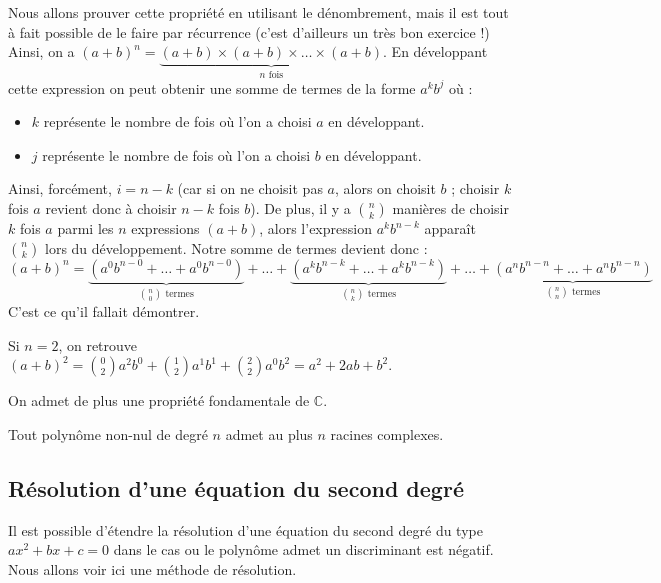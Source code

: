 	\begin{demonstration}
		\contentwidth[big]
		Nous allons prouver cette propriété en utilisant le dénombrement, mais il est tout à fait possible de le faire par récurrence (c'est d'ailleurs un très bon exercice !)
		\newpar
		Ainsi, on a $(a+b)^n = \underbrace{(a + b) \times (a + b) \times \dots \times (a + b)}_{n \text{ fois}}$.
		\newpar
		En développant cette expression on peut obtenir une somme de termes de la forme $a^k b^j$ où :
		\begin{itemize}
			\item $k$ représente le nombre de fois où l'on a choisi $a$ en développant.
			\item $j$ représente le nombre de fois où l'on a choisi $b$ en développant.
		\end{itemize}
		Ainsi, forcément, $i = n-k$ (car si on ne choisit pas $a$, alors on choisit $b$ ; choisir $k$ fois $a$ revient donc à choisir $n-k$ fois $b$).
		\newpar
		De plus, il y a $\binom{n}{k}$ manières de choisir $k$ fois $a$ parmi les $n$ expressions $(a+b)$, alors l'expression $a^k b^{n-k}$ apparaît $\binom{n}{k}$ lors du développement. Notre somme de termes devient donc :
		\newpar
		$ \displaystyle (a+b)^n = \underbrace{(a^0b^{n-0} + \dots + a^0b^{n-0})}_{\binom{n}{0} \text{ termes}} + \dots + \underbrace{(a^kb^{n-k} + \dots + a^kb^{n-k})}_{\binom{n}{k} \text{ termes}} + \dots + \underbrace{(a^nb^{n-n} + \dots + a^nb^{n-n})}_{\binom{n}{n} \text{ termes}} $
		\newpar
		C'est ce qu'il fallait démontrer.
	\end{demonstration}

	\begin{tip}
		\contentwidth[big]
		Si $n = 2$, on retrouve $(a+b)^2 = \binom{0}{2} a^2 b^0 + \binom{1}{2}a^1 b^1 + \binom{2}{2} a^0 b^2 = a^2 + 2ab + b^2$.
	\end{tip}

	On admet de plus une propriété fondamentale de $\mathbb{C}$.

	\begin{formula}
		Tout polynôme non-nul de degré $n$ admet au plus $n$ racines complexes.
	\end{formula}

	\subsection{Résolution d'une équation du second degré}

	Il est possible d'étendre la résolution d'une équation du second degré du type $ax^2 + bx + c = 0$ dans le cas ou le polynôme admet un discriminant est négatif. Nous allons voir ici une méthode de résolution.

